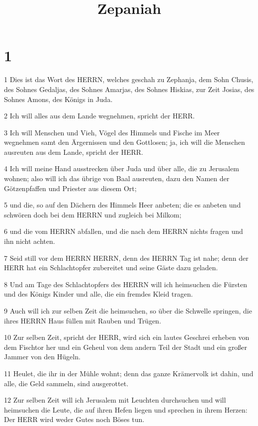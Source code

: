 

\title{Zepaniah}


\chapter{1}

\par 1 Dies ist das Wort des HERRN, welches geschah zu Zephanja, dem Sohn Chusis, des Sohnes Gedaljas, des Sohnes Amarjas, des Sohnes Hiskias, zur Zeit Josias, des Sohnes Amons, des Königs in Juda.
\par 2 Ich will alles aus dem Lande wegnehmen, spricht der HERR.
\par 3 Ich will Menschen und Vieh, Vögel des Himmels und Fische im Meer wegnehmen samt den Ärgernissen und den Gottlosen; ja, ich will die Menschen ausreuten aus dem Lande, spricht der HERR.
\par 4 Ich will meine Hand ausstrecken über Juda und über alle, die zu Jerusalem wohnen; also will ich das übrige von Baal ausreuten, dazu den Namen der Götzenpfaffen und Priester aus diesem Ort;
\par 5 und die, so auf den Dächern des Himmels Heer anbeten; die es anbeten und schwören doch bei dem HERRN und zugleich bei Milkom;
\par 6 und die vom HERRN abfallen, und die nach dem HERRN nichts fragen und ihn nicht achten.
\par 7 Seid still vor dem HERRN HERRN, denn des HERRN Tag ist nahe; denn der HERR hat ein Schlachtopfer zubereitet und seine Gäste dazu geladen.
\par 8 Und am Tage des Schlachtopfers des HERRN will ich heimsuchen die Fürsten und des Königs Kinder und alle, die ein fremdes Kleid tragen.
\par 9 Auch will ich zur selben Zeit die heimsuchen, so über die Schwelle springen, die ihres HERRN Haus füllen mit Rauben und Trügen.
\par 10 Zur selben Zeit, spricht der HERR, wird sich ein lautes Geschrei erheben von dem Fischtor her und ein Geheul von dem andern Teil der Stadt und ein großer Jammer von den Hügeln.
\par 11 Heulet, die ihr in der Mühle wohnt; denn das ganze Krämervolk ist dahin, und alle, die Geld sammeln, sind ausgerottet.
\par 12 Zur selben Zeit will ich Jerusalem mit Leuchten durchsuchen und will heimsuchen die Leute, die auf ihren Hefen liegen und sprechen in ihrem Herzen: Der HERR wird weder Gutes noch Böses tun.
